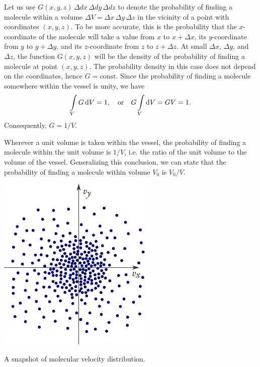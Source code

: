 Let us use $G (x, y, z) \, \Delta dx \, \Delta dy\, \Delta dz$ to denote the probability of finding a molecule within a volume $ \Delta V = \Delta x \, \Delta y \, \Delta z$ in the vicinity of a point with coordinates $(x, y, z)$. To be more accurate, this is the probability that the $x$-coordinate of the molecule will take a value from $x$ to $x + \Delta x$, its $y$-coordinate from $y$ to $y + \Delta y$, and its $z$-coordinate from $z$ to $z + \Delta z$. At small $ \Delta x, \, \Delta y$, and $ \Delta z$, the function $G(x, y, z)$ will be the density of the probability of finding a molecule at point $(x, y, z)$. The probability density in this case does not depend on the coordinates, hence $G = \text{const}$. Since the probability of finding a molecule somewhere within the vessel is unity, we have
\begin{equation*}%
\int\limits_{V} G \, \dd V =1,  \qor  G \int\limits_{V}  \dd V = GV = 1.
\end{equation*}
Consequently, $G = 1/V$. 

Wherever a unit volume is taken within the vessel, the probability of finding a molecule within the unit volume is $1/V$, i.e. the ratio of the unit volume to the volume of the vessel. Generalizing this conclusion, we can state that the probability of finding a molecule within volume $V_{0}$ is $V_{0}/V$.

\begin{marginfigure}%
\centering
\includegraphics[width=\textwidth]{figures/mol-dist.pdf}
\caption{A snapshot of molecular velocity distribution.}
\label{mol-dist}
\end{marginfigure}

